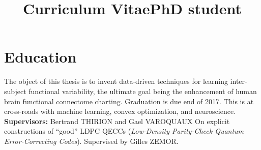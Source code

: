 \documentclass[11pt,a4paper,roman,unicode]{moderncv}
\title{Curriculum Vitae}
\title{PhD student}
\begin{document}
\maketitle
\section{Education}
        {The object of this thesis is to invent data-driven techniques for learning inter-subject functional variability, the ultimate goal being the enhancement of human brain functional connectome charting. Graduation is due end of 2017. This is at cross-roads with machine learning, convex optimization,
          and neuroscience.\\
          \textbf{Supervisors:} Bertrand THIRION and Gael VAROQUAUX}
{On explicit constructions of ``good'' LDPC QECCs (\emph{Low-Density Parity-Check Quantum Error-Correcting Codes}). Supervised by Gilles ZEMOR.}
{}
\end{document}
